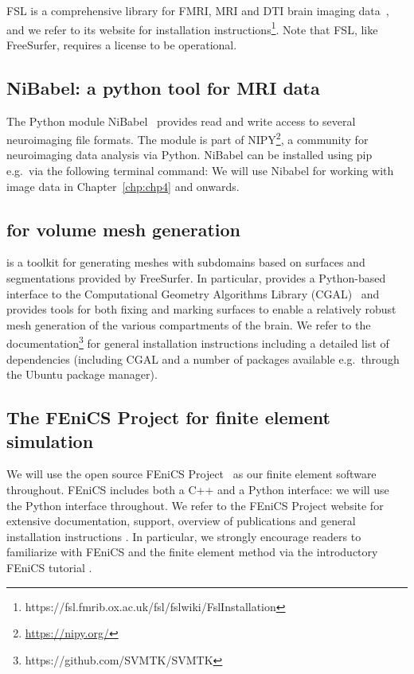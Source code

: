 FSL is a comprehensive library for FMRI, MRI and DTI brain imaging
data~\cite{jenkinson2012fsl}, and we refer to its website for
installation
instructions\footnote{https://fsl.fmrib.ox.ac.uk/fsl/fslwiki/FslInstallation}. Note
that FSL, like FreeSurfer, requires a license to be operational.

\subsection{NiBabel: a python tool for MRI data}\label{sec:chp2:tools:nibabel-numpy}

The Python module NiBabel~\cite{brett_matthew_2020_4295521} provides read and write
access to several neuroimaging file formats. The module is part of
NIPY\footnote{\url{https://nipy.org/}}, a community for neuroimaging
data analysis via Python. NiBabel can be installed using pip e.g.~via the  
following terminal command:
\noindent We will use Nibabel for working with image data in
Chapter~\ref{chp:chp4} and onwards.

\subsection{\svmtk{} for volume mesh generation}
\label{sec:chp2:tools:meshing:svmtk}

\svmtk{} is a toolkit for generating meshes with subdomains based on
surfaces and segmentations provided by FreeSurfer. In particular,
\svmtk{} provides a Python-based interface to the Computational
Geometry Algorithms Library (CGAL)~\cite{fabri2000design} and provides
tools for both fixing and marking surfaces to enable a relatively
robust mesh generation of the various compartments of the brain.  We
refer to the \svmtk{}
documentation\footnote{https://github.com/SVMTK/SVMTK} for general
installation instructions including a detailed list of dependencies
(including CGAL and a number of packages available e.g.~through the
Ubuntu package manager).

\subsection{The FEniCS Project for finite element simulation}
\label{sec:chp2:tools:fenics}

We will use the open source FEniCS Project~\cite{alnaes2015fenics,
  logg2012automated} as our finite element software throughout. FEniCS
includes both a C++ and a Python interface: we will use the Python
interface throughout. We refer to the FEniCS Project website for
extensive documentation, support, overview of publications and general
installation instructions \cite{fenicsproject}. In particular, we
strongly encourage readers to familiarize with FEniCS and the finite
element method via the introductory FEniCS tutorial
\cite{langtangen2016solving}.

